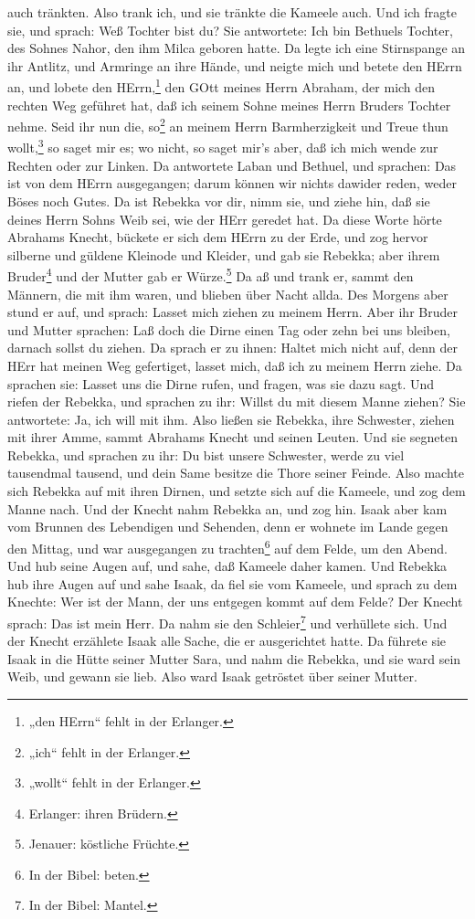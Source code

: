 \begin{schriftzitat}
auch tränkten. Also trank ich, und sie tränkte die Kameele auch. Und ich fragte sie, und sprach: Weß Tochter bist du? Sie antwortete: Ich bin Bethuels Tochter, des Sohnes Nahor, den ihm Milca geboren hatte. Da legte ich eine Stirnspange an ihr Antlitz, und Armringe an ihre Hände, und neigte mich und betete den HErrn an, und lobete den HErrn,\footnote{„den HErrn“ fehlt in der Erlanger.} den GOtt meines Herrn Abraham, der mich den rechten Weg geführet hat, daß ich seinem Sohne meines Herrn Bruders Tochter nehme. Seid ihr nun die, so\footnote{„ich“ fehlt in der Erlanger.} an meinem Herrn Barmherzigkeit und Treue thun wollt,\footnote{„wollt“ fehlt in der Erlanger.} so saget mir es; wo nicht, so saget mir’s aber, daß ich mich wende zur Rechten oder zur Linken. Da antwortete Laban und Bethuel, und sprachen: Das ist von dem HErrn ausgegangen; darum können wir nichts dawider reden, weder Böses noch Gutes. Da ist Rebekka vor dir, nimm sie, und ziehe hin, daß sie deines Herrn Sohns Weib sei, wie der HErr geredet hat. Da diese Worte hörte Abrahams Knecht, bückete er sich dem HErrn zu der Erde, und zog hervor silberne und güldene Kleinode und Kleider, und gab sie Rebekka; aber ihrem Bruder\footnote{Erlanger: ihren Brüdern.} und der Mutter gab er Würze.\footnote{Jenauer: köstliche Früchte.} Da aß und trank er, sammt den Männern, die mit ihm waren, und blieben über Nacht allda. Des Morgens aber stund er auf, und sprach: Lasset mich ziehen zu meinem Herrn. Aber ihr Bruder und Mutter sprachen: Laß doch die Dirne einen Tag oder zehn bei uns bleiben, darnach sollst du ziehen. Da sprach er zu ihnen: Haltet mich nicht auf, denn der HErr hat meinen Weg gefertiget, lasset mich, daß ich zu meinem Herrn ziehe. Da sprachen sie: Lasset uns die Dirne rufen, und fragen, was sie dazu sagt. Und riefen der Rebekka, und sprachen zu ihr: Willst du mit diesem Manne ziehen? Sie antwortete: Ja, ich will mit ihm. Also ließen sie Rebekka, ihre Schwester, ziehen mit ihrer Amme, sammt Abrahams Knecht und seinen Leuten. Und sie segneten Rebekka, und sprachen zu ihr: Du bist unsere Schwester, werde zu viel tausendmal tausend, und dein Same besitze die Thore seiner Feinde. Also machte sich Rebekka auf mit ihren Dirnen, und setzte sich auf die Kameele, und zog dem Manne nach. Und der Knecht nahm Rebekka an, und zog hin. Isaak aber kam vom Brunnen des Lebendigen und Sehenden, denn er wohnete im Lande gegen den Mittag, und war ausgegangen zu trachten\footnote{In der Bibel: beten.} auf dem Felde, um den Abend. Und hub seine Augen auf, und sahe, daß Kameele daher kamen. Und Rebekka hub ihre Augen auf und sahe Isaak, da fiel sie vom Kameele, und sprach zu dem Knechte: Wer ist der Mann, der uns entgegen kommt auf dem Felde? Der Knecht sprach: Das ist mein Herr. Da nahm sie den Schleier\footnote{In der Bibel: Mantel.} und verhüllete sich. Und der Knecht erzählete Isaak alle Sache, die er ausgerichtet hatte. Da führete sie Isaak in die Hütte seiner Mutter Sara, und nahm die Rebekka, und sie ward sein Weib, und gewann sie lieb. Also ward Isaak getröstet über seiner Mutter.
\end{schriftzitat}

